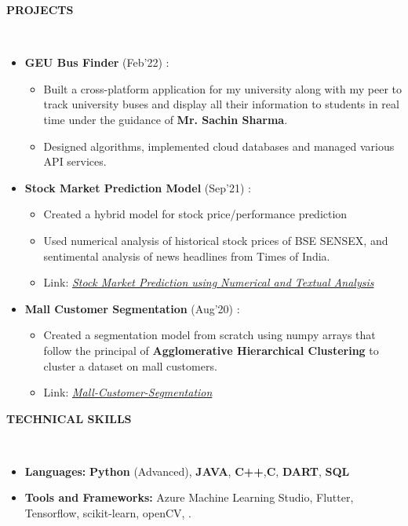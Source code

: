 \documentclass[a4paper,10pt]{article}
\newcommand{\lsep}{-0.5cm}
\newcommand{\resheading}[1]{{\small \colorbox{mygrey}{\begin{minipage}{0.975\textwidth}{\textbf{#1 \vphantom{p\^{E}}}}\end{minipage}}}}
\begin{document}
\resheading{\textbf{PROJECTS} }\\[\lsep]
\begin{itemize}[itemsep=0.01mm, parsep=2pt]

\item \textbf{GEU Bus Finder} (Feb'22) : 
\begin{itemize}[itemsep=0.01mm, parsep=2pt]
\item Built a cross-platform application for my university along with my peer to track university buses and display all their information to students in real time under the guidance of \textbf{Mr. Sachin Sharma}.
\item Designed algorithms, implemented cloud databases and managed various API services.
\end{itemize}

\item \textbf{Stock Market Prediction Model} (Sep'21) : 
\begin{itemize}[itemsep=0.01mm, parsep=2pt]
\item Created a hybrid model for stock price/performance prediction
\item Used numerical analysis of historical stock prices of BSE SENSEX, and sentimental analysis of news headlines from Times of India. 
\item Link: \href{https://github.com/Ash20vyas/TSF-Intern-Tasks/tree/main/%232%20-%20Stock%20Market%20Prediction%20using%20Numerical%20and%20Textual%20Analysis} {\textit{Stock Market Prediction using Numerical and Textual Analysis}}
\end{itemize}

\item \textbf{Mall Customer Segmentation} (Aug'20) : \begin{itemize}[itemsep=0.01mm, parsep=2pt]
\item Created a segmentation model from scratch using numpy arrays that follow the principal of \textbf{Agglomerative Hierarchical Clustering} to cluster a dataset on mall customers. 
\item Link: \href{https://github.com/Ash20vyas/Mall-Customer-Segmentation} {\textit{Mall-Customer-Segmentation}}
\end{itemize}

\end{itemize}

\resheading{\textbf{TECHNICAL SKILLS} }\\[\lsep]
\begin{itemize}[itemsep=0.01mm, parsep=2pt]
\item \noindent \textbf{Languages:} \textbf{Python} (Advanced), \textbf{JAVA}, \textbf{C++},\textbf{C},  \textbf{DART}, \textbf{SQL} \\
\item \noindent\textbf{Tools and Frameworks:} Azure Machine Learning Studio, Flutter, Tensorflow, scikit-learn, openCV, .\\
\end{itemize}
\end{document}
